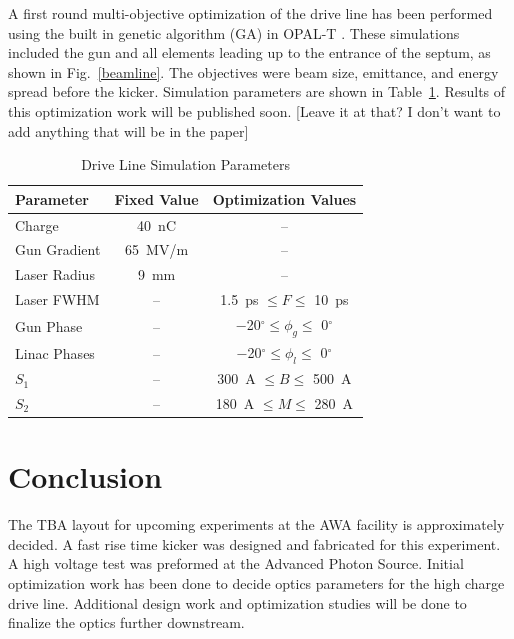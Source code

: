 \documentclass[letterpaper,  %
              ]{jacow-2_3}   %
\begin{document}
A first round multi-objective optimization of the drive line has been performed 
using the built in genetic algorithm (GA) in OPAL-T \cite{opal}. 
These simulations included the gun and all elements leading up 
to the entrance of the septum, as shown in Fig.~\ref{beamline}.
The objectives were beam size, emittance, and energy spread before the kicker.
Simulation parameters are shown in Table~\ref{simparam}.
Results of this optimization work will be published soon.
[Leave it at that? I don't want to add anything that will be in the paper]
\begin{table}[hbt]
	\centering
	\caption{Drive Line Simulation Parameters}
	\begin{tabular}{lcc}
		\toprule
		\textbf{Parameter} & \textbf{Fixed Value}  & \textbf{Optimization Values} \\
		\midrule
		Charge       & \SI{40}{nC}       & --   \\ %
		Gun Gradient & \SI{65}{MV/m}     & --  \\ %
		Laser Radius & \SI{9}{mm}        & --    \\
		Laser FWHM   & --      			 & \SI{1.5}{ps} $\leq F \leq $ \SI{10}{ps}	  \\ %
		Gun Phase    & -- 				 & \SI{-20}{}$^{\circ} \leq \phi_g \leq$ \SI{0}{}$^{\circ}$  \\	
		Linac Phases & --		         & \SI{-20}{}$^{\circ} \leq \phi_l \leq$ \SI{0}{}$^{\circ}$ 	  \\	 
		$S_1$        & --		 		 & \SI{300}{A} $\leq B \leq $ \SI{500}{A}	  \\
		$S_2$		 & --  	 			 & \SI{180}{A} $\leq M \leq $ \SI{280}{A}	  \\
		\bottomrule
	\end{tabular}
	\label{simparam}
\end{table}


\section{Conclusion}
The TBA layout for upcoming experiments at the 
AWA facility is approximately decided. A fast rise time kicker
was designed and fabricated for this experiment. 
A high voltage test was preformed at the 
Advanced Photon Source. Initial optimization 
work has been done to decide  
optics parameters for the high charge drive line.
Additional design work and optimization studies will be done 
to finalize the optics further downstream. 
\end{document}
